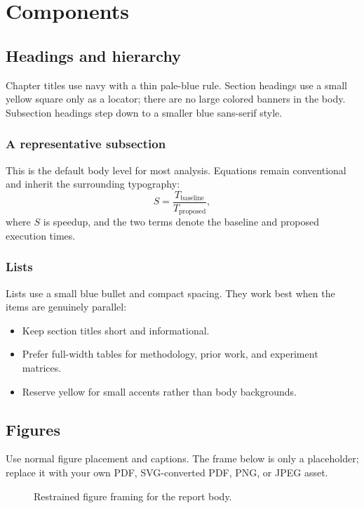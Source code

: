 \chapter{Components}

\section{Headings and hierarchy}
Chapter titles use navy with a thin pale-blue rule. Section headings use a small yellow square only as a locator; there are no large colored banners in the body. Subsection headings step down to a smaller blue sans-serif style.

\subsection{A representative subsection}
This is the default body level for most analysis. Equations remain conventional and inherit the surrounding typography:
\begin{equation}
  S = \frac{T_{\mathrm{baseline}}}{T_{\mathrm{proposed}}},
\end{equation}
where \(S\) is speedup, and the two terms denote the baseline and proposed execution times.

\subsection{Lists}
Lists use a small blue bullet and compact spacing. They work best when the items are genuinely parallel:
\begin{itemize}
  \item Keep section titles short and informational.
  \item Prefer full-width tables for methodology, prior work, and experiment matrices.
  \item Reserve yellow for small accents rather than body backgrounds.
\end{itemize}

\section{Figures}
Use normal figure placement and captions. The frame below is only a placeholder; replace it with your own PDF, SVG-converted PDF, PNG, or JPEG asset.

\begin{figure}[htbp]
  \centering
  \caption{Restrained figure framing for the report body.}
\end{figure}

